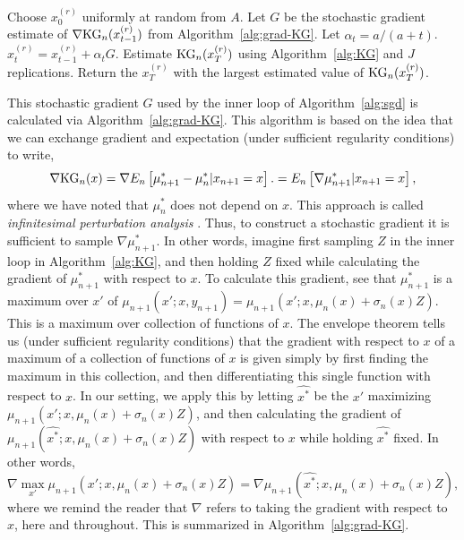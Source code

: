 \documentclass{article}
\begin{document}
\begin{algorithmic}
\begin{algorithm}
\STATE Choose $x_0^{(r)}$ uniformly at random from $A$.
\STATE Let $G$ be the stochastic gradient estimate of $\nabla \mathrm{KG}_n(x_{t-1}^{(r)})$ from Algorithm~\ref{alg:grad-KG}.
\STATE Let $\alpha_t = a / (a+t)$.
\STATE $x_{t}^{(r)} = x_{t-1}^{(r)} + \alpha_t G$.
\ENDFOR
\STATE Estimate $\mathrm{KG}_n(x_T^{(r)})$ using Algorithm~\ref{alg:KG} and $J$ replications.
\ENDFOR
\STATE Return the $x_T^{(r)}$ with the largest estimated value of $\mathrm{KG}_n(x_T^{(r)})$.
\caption{
Efficient method for finding $x$ with the largest $\KG_n(x)$, based on 
multistart stochastic gradient ascent.  Takes as input a number of starts $R$, a number of iterations $T$ for each pass of stochastic gradient ascent, a parameter $a$ used to define a stepsize sequence, and a number of replications $J$.  Suggested input parameters: $R=10$, $T=10^2$, $a=4$, $J=10^3$.
\label{alg:sgd}
}
\end{algorithm}
\end{algorithmic}

This stochastic gradient $G$ used by the inner loop of Algorithm~\ref{alg:sgd} is calculated via Algorithm~\ref{alg:grad-KG}. 
This algorithm is based on the idea that we can exchange gradient and expectation (under sufficient regularity conditions) to write,
\begin{equation*}
\nabla \mathrm{KG}_n(x) = \nabla E_n\left[ \mu^*_{n+1} - \mu^*_n | x_{n+1} = x\right].
= E_n\left[ \nabla \mu^*_{n+1} | x_{n+1} = x\right],
\end{equation*}
where we have noted that $\mu^*_n$ does not depend on $x$.
This approach is called {\it infinitesimal perturbation analysis} \citep{ho1983infinitesimal}.
Thus, to construct a stochastic gradient it is sufficient to sample $\nabla \mu^*_{n+1}$.
In other words, imagine first sampling $Z$ in the inner loop in Algorithm~\ref{alg:KG}, and then holding $Z$ fixed while calculating the gradient of $\mu_{n+1}^*$ with respect to $x$.
To calculate this gradient, see that $\mu_{n+1}^*$ is a maximum over $x'$ of $\mu_{n+1}(x'; x, y_{n+1}) = \mu_{n+1}(x'; x, \mu_n(x) + \sigma_n(x) Z)$.  This is a maximum over collection of functions of $x$.
The envelope theorem \citep{milgrom2002envelope} tells us (under sufficient regularity conditions) that the gradient with respect to $x$ of a maximum of a collection of functions of $x$ is given simply by first finding the maximum in this collection, and then differentiating this single function with respect to $x$.
In our setting, we apply this by letting $\widehat{x^*}$ be the $x'$ maximizing
$\mu_{n+1}(x'; x, \mu_n(x) + \sigma_n(x) Z)$, and then calculating the gradient of 
$\mu_{n+1}(\widehat{x^*}; x, \mu_n(x) + \sigma_n(x) Z)$ with respect to $x$ while holding $\widehat{x^*}$ fixed.
In other words,
\begin{equation*}
\nabla 
\max_{x'} \mu_{n+1}(x'; x, \mu_n(x) + \sigma_n(x) Z)
= \nabla \mu_{n+1}(\widehat{x^*}; x, \mu_n(x) + \sigma_n(x) Z),
\end{equation*}
where we remind the reader that $\nabla$ refers to taking the gradient with respect to $x$, here and throughout.
This is summarized in Algorithm~\ref{alg:grad-KG}.
\end{document}
